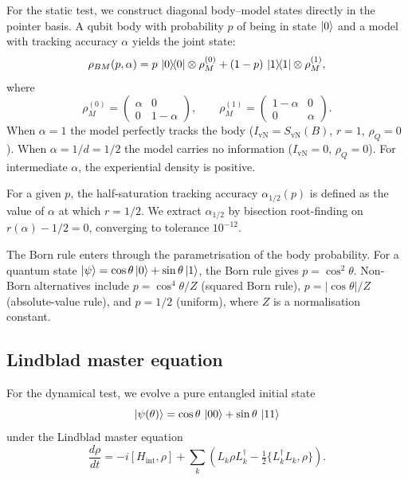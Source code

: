 \documentclass[12pt,a4paper]{article}
\newcommand{\SvN}{S_{\mathrm{vN}}}
\newcommand{\IvN}{I_{\mathrm{vN}}}
\newcommand{\rhoQ}{\rho_Q}
\begin{document}
For the static test, we construct diagonal body--model states
directly in the pointer basis.  A qubit body with probability $p$
of being in state $\ket{0}$ and a model with tracking accuracy
$\alpha$ yields the joint state:
\begin{equation}\label{eq:diagonal-state}
  \rho_{BM}(p,\alpha) = p\,\ketbra{0}{0} \otimes \rho_M^{(0)}
  + (1-p)\,\ketbra{1}{1} \otimes \rho_M^{(1)},
\end{equation}
where
\begin{equation}\label{eq:model-states}
  \rho_M^{(0)} = \begin{pmatrix} \alpha & 0 \\ 0 & 1-\alpha
  \end{pmatrix},
  \qquad
  \rho_M^{(1)} = \begin{pmatrix} 1-\alpha & 0 \\ 0 & \alpha
  \end{pmatrix}.
\end{equation}
When $\alpha = 1$ the model perfectly tracks the body
($\IvN = \SvN(B)$, $r = 1$, $\rhoQ = 0$).  When
$\alpha = 1/d = 1/2$ the model carries no information
($\IvN = 0$, $\rhoQ = 0$).  For intermediate $\alpha$, the
experiential density is positive.

For a given $p$, the half-saturation tracking accuracy
$\alpha_{1/2}(p)$ is defined as the value of $\alpha$ at which
$r = 1/2$.  We extract $\alpha_{1/2}$ by bisection root-finding on
$r(\alpha) - 1/2 = 0$, converging to tolerance $10^{-12}$.

The Born rule enters through the parametrisation of the body
probability.  For a quantum state $\ket{\psi} = \cos\theta\ket{0}
+ \sin\theta\ket{1}$, the Born rule gives $p = \cos^2\theta$.
Non-Born alternatives include $p = \cos^4\theta / Z$ (squared Born
rule), $p = |\cos\theta| / Z$ (absolute-value rule), and
$p = 1/2$ (uniform), where $Z$ is a normalisation constant.

\subsection{Lindblad master equation}\label{sec:lindblad}

For the dynamical test, we evolve a pure entangled initial state
\begin{equation}\label{eq:initial}
  \ket{\psi(\theta)} = \cos\theta\,\ket{00} + \sin\theta\,\ket{11}
\end{equation}
under the Lindblad master equation
\begin{equation}\label{eq:lindblad}
  \frac{d\rho}{dt} = -i[H_{\mathrm{int}}, \rho]
  + \sum_k \left(
    L_k \rho L_k^\dagger
    - \tfrac{1}{2}\{L_k^\dagger L_k, \rho\}
  \right).
\end{equation}
\end{document}
